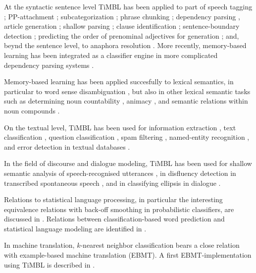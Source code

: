 \documentclass{report}
\begin{document}
At the syntactic sentence level TiMBL has been applied to part of speech tagging \cite{Daelemans+96b,Zavrel+99,Halteren+01}; PP-attachment \cite{Zavrel+97b}; subcategorization \cite{Buchholz98}; phrase chunking \cite{Veenstra98,Sang+99}; dependency parsing \cite{Canisius+06b}, article generation \cite{Minnen+00}; shallow parsing \cite{Daelemans+99a,Buchholz+99,Yeh00}; clause identification \cite{Orasan00,Sang01}; sentence-boundary detection \cite{Stevenson+00}; predicting the order of prenominal adjectives for generation \cite{Malouf00}; and, beynd the sentence level, to anaphora resolution \cite{Preiss02,Mitkov+02,Hoste05}. More recently, memory-based learning has been integrated as a classifier engine in more complicated dependency parsing systems \cite{Nivre+04,Sagae+05,Canisius+06b}.

Memory-based learning has been applied succesfully to lexical semantics, in particular to word sense disambiguation \cite{Veenstra+00,Stevenson+99,Kokkinakis00,Mihalcea02,Hoste+02,DeCadt+04}, but also in other lexical semantic tasks such as determining noun countability \cite{Baldwin+03}, animacy \cite{Orasan+01}, and semantic relations within noun compounds \cite{Kim+06b,Nastase+06}.

On the textual level, TiMBL has been used for information extraction \cite{Zavrel+00b,Zavrel+03,Ahn06}, text classification \cite{Spitters00}, question classification \cite{Garcia+06,Dridan+07}, spam filtering \cite{Androutsopoulos+00,}, named-entity recognition \cite{Buchholz+00,Hendrickx+03,DeMeulder+03,Sporleder+06b,Leveling+06}, and error detection in textual databases \cite{Sporleder+06}.

In the field of discourse and dialogue modeling, TiMBL has been used for shallow semantic analysis of speech-recognised utterances \cite{Gustafson+99,Krahmer+01,VandenBosch+01,Lendvai+02a,Lendvai+03}, in disfluency detection in transcribed spontaneous speech \cite{Lendvai+03c}, and in classifying ellipsis in dialogue \cite{Fernandez+04}.

Relations to statistical language processing, in particular the interesting equivalence relations with back-off smoothing in probabilistic classifiers, are discussed in \cite{Zavrel+97}. Relations between classification-based word prediction and statistical language modeling are identified in \cite{VandenBosch05,VandenBosch06}.

In machine translation, $k$-nearest neighbor classification bears a close relation with example-based machine translation (EBMT). A first EBMT-implementation using TiMBL is described in \cite{VandenBosch+07}.
\end{document}
